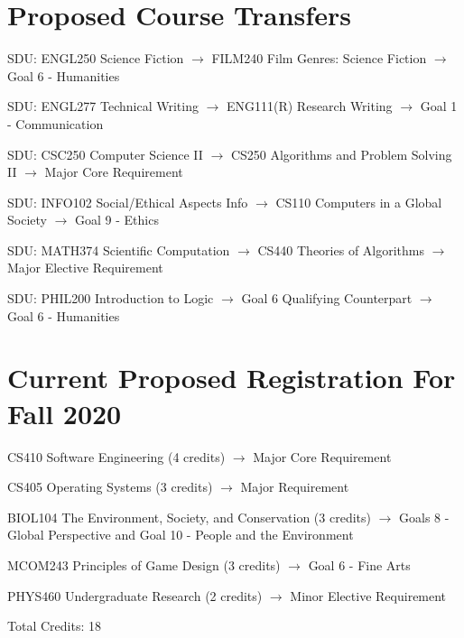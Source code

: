 \documentclass[prb,preprint]{revtex4-1}
\begin{document}
\onehalfspacing

\section*{Proposed Course Transfers}
SDU: ENGL250 Science Fiction $\rightarrow$ FILM240 Film Genres: Science Fiction \newline
\indent $\rightarrow$ Goal 6 - Humanities \newline

SDU: ENGL277 Technical Writing $\rightarrow$ ENG111(R) Research Writing \newline
\indent $\rightarrow$ Goal 1 - Communication \newline

SDU: CSC250 Computer Science II $\rightarrow$ CS250 Algorithms and Problem Solving II \newline
\indent $\rightarrow$ Major Core Requirement \newline

SDU: INFO102 Social/Ethical Aspects Info $\rightarrow$ CS110 Computers in a Global Society \newline
\indent $\rightarrow$ Goal 9 - Ethics \newline

SDU: MATH374 Scientific Computation $\rightarrow$ CS440 Theories of Algorithms \newline
\indent $\rightarrow$ Major Elective Requirement \newline

SDU: PHIL200 Introduction to Logic $\rightarrow$ Goal 6 Qualifying Counterpart \newline
\indent $\rightarrow$ Goal 6 - Humanities 


\section*{Current Proposed Registration For Fall 2020}
CS410 Software Engineering (4 credits) \newline
\indent $\rightarrow$ Major Core Requirement \newline

CS405 Operating Systems (3 credits) \newline
\indent $\rightarrow$ Major Requirement \newline

BIOL104 The Environment, Society, and Conservation (3 credits) \newline
\indent $\rightarrow$ Goals 8 - Global Perspective and Goal 10 - People and the Environment \newline

MCOM243 Principles of Game Design (3 credits) \newline
\indent $\rightarrow$ Goal 6 - Fine Arts \newline

PHYS460 Undergraduate Research (2 credits) \newline
\indent $\rightarrow$ Minor Elective Requirement \newline

Total Credits: 18
\end{document}
